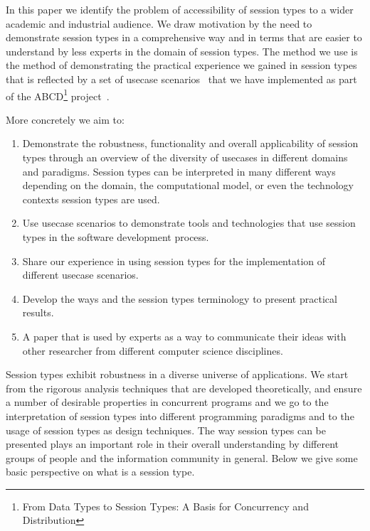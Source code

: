 In this paper we identify the problem of accessibility of session
types to a wider academic and industrial audience.
We draw motivation by the need to demonstrate session
types in a comprehensive way and in terms that are easier to
understand by less experts in the domain of session types.
The method we use is the method of demonstrating the practical
experience we gained in session types that is reflected by a set of
usecase scenarios~\cite{usecase_repository} that we have implemented as part of 
the ABCD\footnote{From Data Types to Session Types:
A Basis for Concurrency and Distribution} project~\cite{ABCD}.

More concretely we aim to:
%
\begin{enumerate}%
	\item	Demonstrate the robustness, functionality and overall applicability of
			session types through an overview of the diversity of usecases in
			different domains and paradigms. Session types can be interpreted
			in many different ways depending on the domain, the computational
			model, or even the technology contexts session types are used.

	\item	Use usecase scenarios to demonstrate tools and technologies that
			use session types in the software development process.

	\item	Share our experience in using session types for the
			implementation of different usecase scenarios.

	\item	Develop the ways and the session types terminology to
			present practical results.

	\item	A paper that is used by experts as a way to communicate
			their ideas with other researcher from different computer
			science disciplines.
\end{enumerate}

Session types exhibit robustness in a diverse universe of applications.
We start from the rigorous analysis techniques that are developed theoretically,
and ensure a number of desirable properties in concurrent programs and we go
to the interpretation of session types into different programming paradigms
and to the usage of session types as design techniques.
The way session types can be presented plays an important role in their
overall understanding by different groups of people and the information
community in general. Below we give some basic perspective on what
is a session type.

